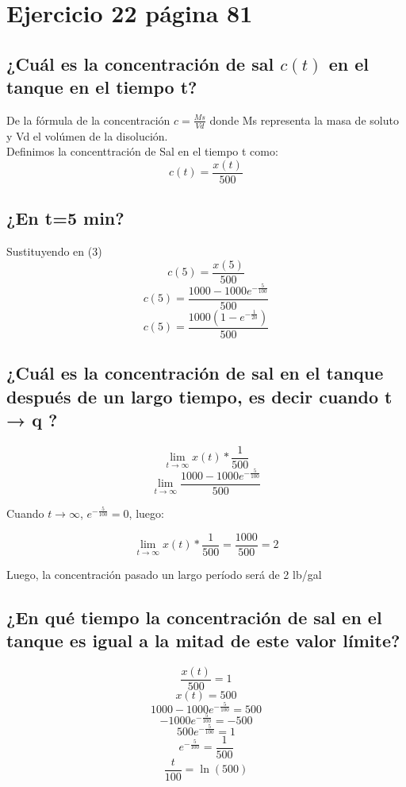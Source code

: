 \documentclass{article}
\begin{document}
    \section{Ejercicio 22 página 81}
        
        \subsection{¿Cuál es la concentración de sal $c(t)$ en el tanque en el tiempo t?}
            De la fórmula de la concentración $c = \frac{Ms}{Vd}$ donde Ms representa la masa 
            de soluto y Vd el volúmen de la disolución.\\ 
            Definimos la concenttración de Sal en el tiempo t como:
            \begin{equation}
                c(t) = \frac{x(t)}{500}
            \end{equation}
        \subsection{¿En t=5 min?}
            Sustituyendo en (3)
            \[ c(5) = \frac{x(5)}{500} \]
            \[ c(5) = \frac{1000-1000e^{-\frac{5}{100}}}{500} \]
            \[ c(5) = \frac{1000(1-e^{-\frac{1}{20}})}{500} \]
            \begin{center}
            \end{center}
    
        \subsection{¿Cuál es
        la concentración de sal en el tanque después de un largo
        tiempo, es decir cuando t → q ?}

            \[ \lim_{t \to \infty} x(t) * \frac{1}{500} \]
            \[ \lim_{t \to \infty} \frac{1000-1000e^{-\frac{5}{100}}}{500} \]

            Cuando $t \to \infty$, $e^{-\frac{5}{100}} = 0$, luego:

            \[ \lim_{t \to \infty} x(t) * \frac{1}{500} = \frac{1000}{500} = 2 \]
                
            Luego, la concentración pasado un largo período será de 2 lb/gal
        \subsection{¿En qué tiempo la concentración de sal en el tanque es igual a la mitad de este
        valor límite?}

        \[  \frac{x(t)}{500} = 1\]
        \[ x(t) = 500\]
        \[ 1000-1000e^{-\frac{5}{100}} = 500 \]
        \[ -1000e^{-\frac{5}{100}} = -500 \]
        \[ 500e^{-\frac{5}{100}} = 1 \]
        \[  e^{-\frac{5}{100}} = \frac{1}{500} \]
        \[ \frac{t}{100} = \ln(500) \]
        \begin{center}
        \end{center}
\end{document}
